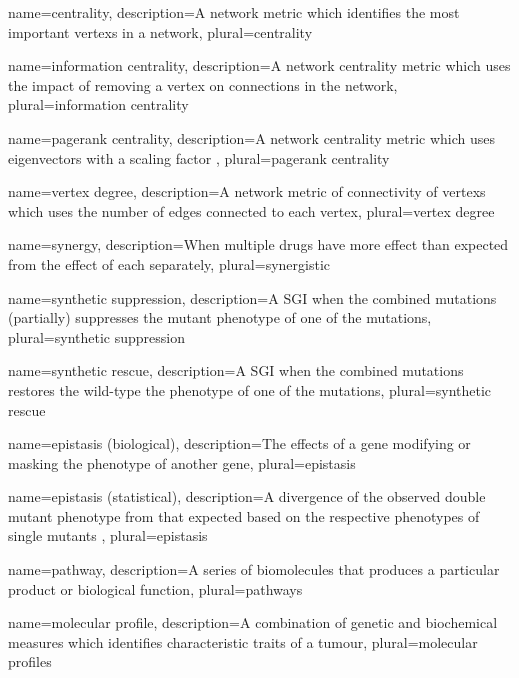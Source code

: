 {
  name=centrality,
  description={A network metric which identifies the most important \glspl{vertex} in a network},
  plural=centrality
}


{
  name=information centrality,
  description={A network \gls{centrality} metric which uses the impact of removing a \gls{vertex} on connections in the network},
  plural=information centrality
}


{
  name=pagerank centrality,
  description={A network \gls{centrality} metric which uses eigenvectors with a scaling factor \citep{Brin1998}},
  plural=pagerank centrality
}


{
  name=vertex degree,
  description={A network metric of connectivity of \glspl{vertex} which uses the number of edges connected to each \gls{vertex}},
  plural=vertex degree
}


{
  name=synergy,
  description={When multiple drugs have more effect than expected from the effect of each separately},
  plural=synergistic
}


{
  name=synthetic suppression,
  description={A \acrlong{SGI} when the combined \glspl{mutation} (partially) suppresses the \gls{mutant} phenotype of one of the \glspl{mutation}},
  plural=synthetic suppression
}


{
  name=synthetic rescue,
  description={A \acrlong{SGI} when the combined \glspl{mutation} restores the \gls{wild-type} the phenotype of one of the \glspl{mutation}},
  plural=synthetic rescue
}


{
  name=epistasis (biological),
  description={The effects of a gene modifying or masking the phenotype of another gene},
  plural=epistasis
}


{
  name=epistasis (statistical),
  description={A divergence of the observed double \gls{mutant} phenotype from that expected based on the respective phenotypes of single \glspl{mutant}  \citep{Fisher1919}},
  plural=epistasis
}


{
  name=pathway,
  description={A series of biomolecules that produces a particular product or biological function},
  plural=pathways
}


{
  name=molecular profile,
  description={A combination of genetic and biochemical measures which identifies characteristic traits of a tumour},
  plural=molecular profiles %
}


